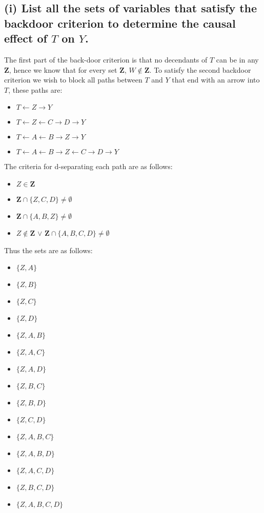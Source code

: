\documentclass{article}
\begin{document}
\subsection*{(i) List all the sets of variables that satisfy the backdoor criterion to determine the causal effect of $T$ on $Y$.}
The first part of the back-door criterion is that no decendants of $T$ can be in any $\mathbf{Z}$, hence we know that for every set $\mathbf{Z}$, $W\notin \mathbf{Z}$.
To satisfy the second backdoor criterion we wish to block all paths between $T$ and $Y$ that end with an arrow into $T$, these paths are:
\begin{itemize}
    \item $T\leftarrow{}Z\rightarrow{}Y$
    \item $T\leftarrow{}Z\leftarrow{}C\rightarrow{}D\rightarrow{}Y$
    \item $T\leftarrow{}A\leftarrow{}B\rightarrow{}Z\rightarrow{}Y$
    \item $T\leftarrow{}A\leftarrow{}B\rightarrow{}Z\leftarrow{}C\rightarrow{}D\rightarrow{}Y$
\end{itemize}
The criteria for d-separating each path are as follows:
\begin{itemize}
    \item $Z\in{}\mathbf{Z}$
    \item $\mathbf{Z}\cap{}\{Z,C,D\}\neq{}\emptyset{}$
    \item $\mathbf{Z}\cap{}\{A,B,Z\}\neq{}\emptyset{}$
    \item $Z\notin{}\mathbf{Z}$ $\lor$ $\mathbf{Z}\cap{}\{A,B,C,D\}\neq{}\emptyset{}$
\end{itemize}
Thus the sets are as follows: 
\begin{itemize}
    \item $\{Z, A\}$
    \item $\{Z, B\}$
    \item $\{Z, C\}$
    \item $\{Z, D\}$
    \item $\{Z, A, B\}$
    \item $\{Z, A, C\}$
    \item $\{Z, A, D\}$
    \item $\{Z, B, C\}$
    \item $\{Z, B, D\}$
    \item $\{Z, C, D\}$
    \item $\{Z, A, B, C\}$
    \item $\{Z, A, B, D\}$
    \item $\{Z, A, C, D\}$
    \item $\{Z, B, C, D\}$
    \item $\{Z, A, B, C, D\}$
\end{itemize}
\end{document}
